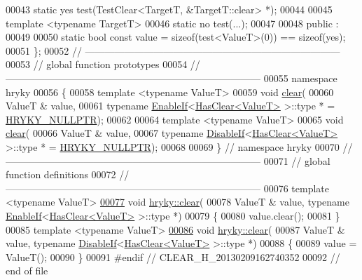 \begin{DoxyCode}
00043     \textcolor{keyword}{static} yes test(TestClear<TargetT, &TargetT::clear> *);
00044 
00045     \textcolor{keyword}{template} <\textcolor{keyword}{typename} TargetT>
00046     \textcolor{keyword}{static} no test(...);
00047 
00048 \textcolor{keyword}{public} :
00049 
00050     \textcolor{keyword}{static} \textcolor{keywordtype}{bool} \textcolor{keyword}{const} value = \textcolor{keyword}{sizeof}(test<ValueT>(0)) == \textcolor{keyword}{sizeof}(yes);
00051 \};
00052 \textcolor{comment}{//
      ------------------------------------------------------------------------------}
00053 \textcolor{comment}{// global function prototypes}
00054 \textcolor{comment}{//
      ------------------------------------------------------------------------------}
00055 \textcolor{keyword}{namespace }hryky
00056 \{
00058     \textcolor{keyword}{template} <\textcolor{keyword}{typename} ValueT>
00059     \textcolor{keywordtype}{void} \hyperlink{namespacehryky_aa201297ea9530da954a7230be71cc19d}{clear}(
00060         ValueT & value,
00061         \textcolor{keyword}{typename} \hyperlink{classhryky_1_1_enable_if}{EnableIf}<\hyperlink{classhryky_1_1_has_clear}{HasClear<ValueT>} >::type * = \hyperlink{common_8h_a4cd4ac09cfcdbd6b30ee69afc156e210}{HRYKY_NULLPTR});
00062 
00064     \textcolor{keyword}{template} <\textcolor{keyword}{typename} ValueT>
00065     \textcolor{keywordtype}{void} \hyperlink{namespacehryky_aa201297ea9530da954a7230be71cc19d}{clear}(
00066         ValueT & value,
00067         \textcolor{keyword}{typename} \hyperlink{classhryky_1_1_disable_if}{DisableIf}<\hyperlink{classhryky_1_1_has_clear}{HasClear<ValueT>} >::type * = \hyperlink{common_8h_a4cd4ac09cfcdbd6b30ee69afc156e210}{HRYKY_NULLPTR});
00068 
00069 \} \textcolor{comment}{// namespace hryky}
00070 \textcolor{comment}{//
      ------------------------------------------------------------------------------}
00071 \textcolor{comment}{// global function definitions}
00072 \textcolor{comment}{//
      ------------------------------------------------------------------------------}
00076 \textcolor{comment}{}\textcolor{keyword}{template} <\textcolor{keyword}{typename} ValueT>
\hypertarget{clear_8h_source_l00077}{}\hyperlink{namespacehryky_aa201297ea9530da954a7230be71cc19d}{00077} \textcolor{keywordtype}{void} \hyperlink{namespacehryky_aa201297ea9530da954a7230be71cc19d}{hryky::clear}(
00078     ValueT & value, \textcolor{keyword}{typename} \hyperlink{classhryky_1_1_enable_if}{EnableIf}<\hyperlink{classhryky_1_1_has_clear}{HasClear<ValueT>} >::type *)
00079 \{
00080     value.clear();
00081 \}
00085 \textcolor{keyword}{template} <\textcolor{keyword}{typename} ValueT>
\hypertarget{clear_8h_source_l00086}{}\hyperlink{namespacehryky_a17ff650587d39be66b7c729876944c21}{00086} \textcolor{keywordtype}{void} \hyperlink{namespacehryky_aa201297ea9530da954a7230be71cc19d}{hryky::clear}(
00087     ValueT & value, \textcolor{keyword}{typename} \hyperlink{classhryky_1_1_disable_if}{DisableIf}<\hyperlink{classhryky_1_1_has_clear}{HasClear<ValueT>} >::type *)
00088 \{
00089     value = ValueT();
00090 \}
00091 \textcolor{preprocessor}{#endif // CLEAR\_H\_20130209162740352}
00092 \textcolor{preprocessor}{}\textcolor{comment}{// end of file}
\end{DoxyCode}
